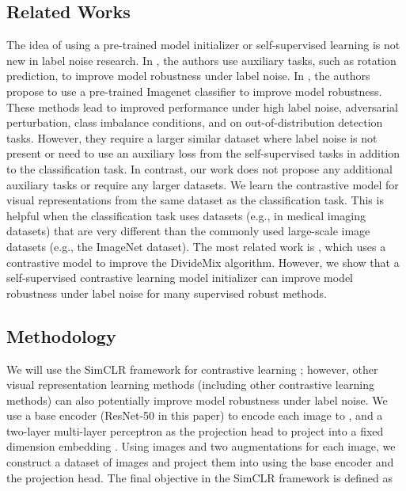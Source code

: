 \documentclass[final]{cvpr}
\begin{document}
\subsection{Related Works}
\vspace{-0.1cm}
The idea of using a pre-trained model initializer or self-supervised learning is not new in label noise research. 
In \cite{self-supervision}, the authors use auxiliary tasks, such as rotation prediction, to improve model robustness under label noise.
In \cite{pretraining}, the authors propose to use a pre-trained Imagenet classifier to improve model robustness. These methods lead to improved performance under high label noise, adversarial perturbation, class imbalance conditions, and on out-of-distribution detection tasks. However, they require a larger similar dataset where label noise is not present or need to use an auxiliary loss from the self-supervised tasks in addition to the classification task. In contrast, our work does not propose any additional auxiliary tasks or require any larger datasets. We learn the contrastive model for visual representations from the same dataset as the classification task. This is helpful when the classification task uses datasets (e.g., in medical imaging datasets) that are very different than the commonly used large-scale image datasets (e.g., the ImageNet dataset). 
The most related work is \cite{c2d}, which uses a contrastive model to improve the DivideMix algorithm. However, we show that a self-supervised contrastive learning model 
initializer can improve model robustness under label noise for many supervised robust methods. 


\vspace{-0.1cm}
\subsection{Methodology}
\vspace{-0.1cm}
We will use the SimCLR framework for contrastive learning \cite{simclr,simclrv2}; however, other visual representation learning methods (including other contrastive learning methods) can also potentially improve model robustness under label noise.
We use a base encoder  (ResNet-50 in this paper) to encode each image  to , and a two-layer multi-layer perceptron   as the projection head to project into a fixed dimension embedding . Using  images and two augmentations for each image, we construct a dataset of  images  and project them into  using the base encoder and the projection head. The final objective in the SimCLR framework is defined as\vspace{-0.1cm}
\end{document}
